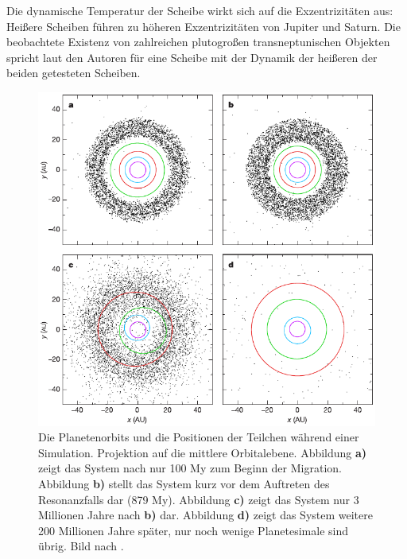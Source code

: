 \documentclass[12pt,a4paper,twoside]{article}
\renewcommand{\cite}{\citep}
\begin{document}
Die dynamische Temperatur der Scheibe wirkt sich auf die Exzentrizitäten aus: Heißere Scheiben führen zu höheren Exzentrizitäten von Jupiter und Saturn. Die beobachtete Existenz von zahlreichen plutogroßen transneptunischen Objekten spricht laut den Autoren für eine Scheibe mit der Dynamik der heißeren der beiden getesteten Scheiben\cite{Stern1991,Tsiganis2005}.

\begin{figure}[tbn]
\centering
\includegraphics[scale=1]{img/Gomes2005-2.pdf}
\caption{Die Planetenorbits und die Positionen der Teilchen während einer Simulation. Projektion auf die mittlere Orbitalebene. Abbildung \textbf{a)} zeigt das System nach nur 100 My zum Beginn der Migration. Abbildung \textbf{b)} stellt das System kurz vor dem Auftreten des Resonanzfalls dar (879 My). Abbildung \textbf{c)} zeigt das System nur 3 Millionen Jahre nach \textbf{b)} dar. Abbildung \textbf{d)} zeigt das System weitere 200 Millionen Jahre später, nur noch wenige Planetesimale sind übrig. Bild nach \cite{Gomes2005}.}
\label{fig:Zeitlicheentwicklung}
\end{figure}

\FloatBarrier
\end{document}
